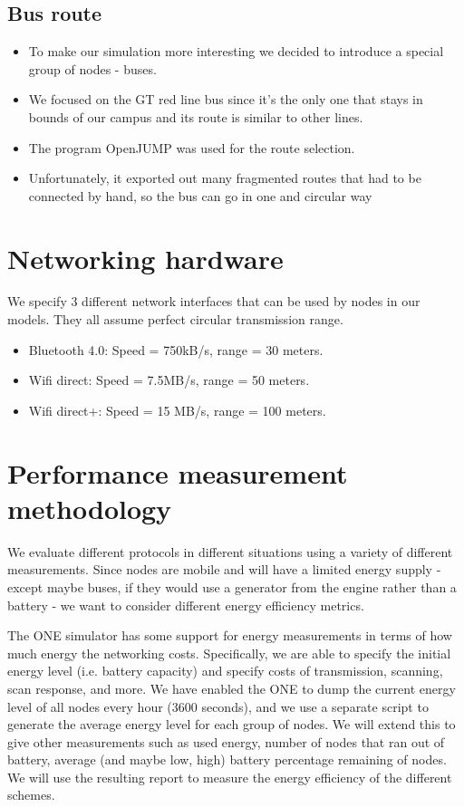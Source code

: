 \documentclass[conference]{IEEEtran}
\begin{document}
\subsection{Bus route}

\begin{itemize}
  \item To make our simulation more interesting we decided to introduce a special group of nodes - buses.
  \item We focused on the GT red line bus since it’s the only one that stays in bounds of our campus and its route is similar to other lines.
  \item The program OpenJUMP was used for the route selection.
  \item Unfortunately, it exported out many fragmented routes that had to be connected by hand, so the bus can go in one and circular way
\end{itemize}

\section{Networking hardware}

We specify 3 different network interfaces that can be used by nodes in our models. They all assume perfect circular transmission range.

\begin{itemize}
  \item Bluetooth 4.0: Speed = 750kB/s, range = 30 meters.
  \item Wifi direct: Speed = 7.5MB/s, range = 50 meters.
  \item Wifi direct+: Speed = 15 MB/s, range = 100 meters.
\end{itemize}

\section{Performance measurement methodology}

We evaluate different protocols in different situations using a variety of different measurements. Since nodes are mobile and will have a limited energy supply - except maybe buses, if they would use a generator from the engine rather than a battery - we want to consider different energy efficiency metrics.

The ONE simulator has some support for energy measurements in terms of how much energy the networking costs. Specifically, we are able to specify the initial energy level (i.e. battery capacity) and specify costs of transmission, scanning, scan response, and more. We have enabled the ONE to dump the current energy level of all nodes every hour (3600 seconds), and we use a separate script to generate the average energy level for each group of nodes. We will extend this to give other measurements such as used energy, number of nodes that ran out of battery, average (and maybe low, high) battery percentage remaining of nodes. We will use the resulting report to measure the energy efficiency of the different schemes.
\end{document}
